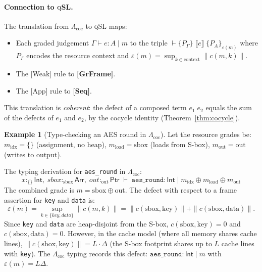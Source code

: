\documentclass[acmsmall,sigplan,anonymous,review,screen]{acmart}
\theoremstyle{plain}
\theoremstyle{definition}
\newtheorem{example}[theorem]{Example}
\newcommand{\qSL}{\textsc{qSL}\xspace}
\newcommand{\defect}{\varepsilon}
\begin{document}
\paragraph{Connection to \qSL.}
The translation from $\Lambda_{\mathrm{coc}}$ to \qSL maps:
\begin{itemize}[itemsep=2pt]
  \item Each graded judgement $\Gamma \vdash e : A \mid m$ to the triple
    $\vdash \{P_\Gamma\}\; \llbracket e \rrbracket\; \{P_A\}_{\defect(m)}$
    where $P_\Gamma$ encodes the resource context and
    $\defect(m) = \sup_{k \in \mathrm{context}} \|c(m, k)\|$.
  \item The [Weak] rule to \textbf{[GrFrame]}.
  \item The [App] rule to \textbf{[Seq]}.
\end{itemize}
This translation is \emph{coherent}: the defect of a composed term
$e_1\; e_2$ equals the sum of the defects of $e_1$ and $e_2$, by the
cocycle identity (Theorem~\ref{thm:cocycle}).

\begin{example}[Type-checking an AES round in $\Lambda_{\mathrm{coc}}$]
\label{ex:lambda-aes}
  Let the resource grades be:
  $m_{\mathrm{idx}} = \{\}$ (assignment, no heap),
  $m_{\mathrm{load}} = \mathrm{sbox}$ (loads from S-box),
  $m_{\mathrm{out}} = \mathrm{out}$ (writes to output).

  The typing derivation for \texttt{aes\_round} in $\Lambda_{\mathrm{coc}}$:
  \[
    x :_{\{\}} \mathsf{Int}, \;\mathit{sbox} :_{\mathrm{sbox}} \mathsf{Arr},\;
    \mathit{out} :_{\mathrm{out}} \mathsf{Ptr}
    \;\vdash\; \texttt{aes\_round} : \mathsf{Int} \mid m_{\mathrm{idx}} \oplus m_{\mathrm{load}} \oplus m_{\mathrm{out}}
  \]
  The combined grade is $m = \mathrm{sbox} \oplus \mathrm{out}$.
  The defect with respect to a frame assertion for \texttt{key} and
  \texttt{data} is:
  \[
    \defect(m) = \sup_{k \in \{\mathit{key}, \mathit{data}\}} \|c(m, k)\|
    = \|c(\mathrm{sbox}, \mathrm{key})\| + \|c(\mathrm{sbox}, \mathrm{data})\|.
  \]
  Since \texttt{key} and \texttt{data} are heap-disjoint from the S-box,
  $c(\mathrm{sbox}, \mathrm{key}) = 0$ and $c(\mathrm{sbox}, \mathrm{data}) = 0$.
  However, in the cache model (where all memory shares cache lines),
  $\|c(\mathrm{sbox}, \mathrm{key})\| = L \cdot \Delta$ (the S-box footprint
  shares up to $L$ cache lines with \texttt{key}).
  The $\Lambda_{\mathrm{coc}}$ typing records this defect:
  $\texttt{aes\_round} : \mathsf{Int} \mid m$ with $\defect(m) = L\Delta$.
\end{example}
\end{document}
